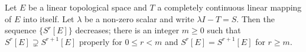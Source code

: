 Let $E$ be a linear topological space and $T$ a completely continuous linear mapping of $E$ into itself. Let $\lambda$ be a non-zero scalar and write $\lambda I - T = S$. Then the sequence $\{S^r[E]\}$ decreases; there is an integer $m \geq 0$ such that $S^r[E] \supsetneq S^{r+1}[E]$ properly for $0 \leq r < m$ and $S^r[E] = S^{r+1}[E]$ for $r \geq m$.
